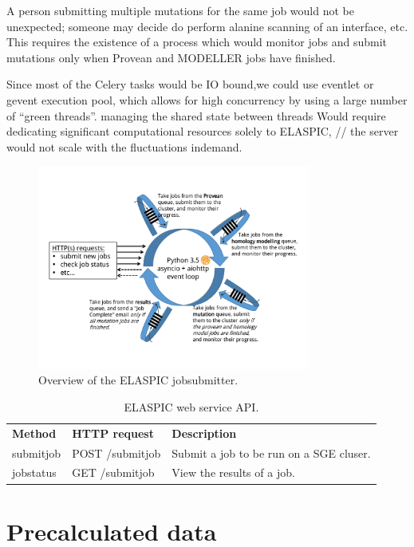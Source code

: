 A person submitting multiple mutations for the same job would not be unexpected; someone may decide do perform alanine scanning of an interface, etc. This requires the existence of a process which would monitor jobs and submit mutations only when Provean and MODELLER jobs have finished.

Since most of the Celery tasks would be IO bound,we could use eventlet or gevent execution pool, which allows for high concurrency by using a large number of ``green threads''.
managing the shared state between threads
Would require dedicating significant computational resources solely to ELASPIC, // the server would not scale with the fluctuations indemand.




\begin{figure}[!tb]
	\centering
	\includegraphics[width=0.8\textwidth]{static/elaspic/elaspic_jobsubmitter.pdf}
	\caption[ELASPIC webservice.]{Overview of the ELASPIC jobsubmitter.}
	\label{fig:elaspic_jobsubmitter}
\end{figure}


\begin{table}[!tb]
	\centering
	\caption{ELASPIC web service API.}
	\label{tab:elaspic_jobsubmitter}
	\begin{tabular}{lll}
	\textbf{Method} & \textbf{HTTP request} & \textbf{Description} \\
	submitjob & POST /submitjob & Submit a job to be run on a SGE cluser. \\
	jobstatus & GET /submitjob & View the results of a job.
	\end{tabular}
\end{table}



\section{Precalculated data}

